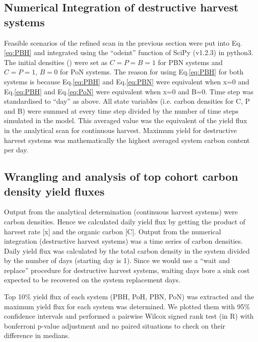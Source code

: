 \documentclass[../thesis.tex]{subfiles} %
\begin{document}
\subsection{Numerical Integration of destructive harvest systems}
Feasible scenarios of the refined scan in the previous section were put into Eq.\ref{eq:PBH} and integrated using the ``odeint” function of SciPy (v1.2.3) in python3.  The initial densities (\den) were set as $C=P=B=1$ for PBN systems and $C=P=1$, $B=0$ for PoN systems.  The reason for using Eq.\ref{eq:PBH} for both systems is because Eq.\ref{eq:PBH} and Eq.\ref{eq:PBN} were equivalent when x=0 and Eq.\ref{eq:PBH} and Eq.\ref{eq:PoN} were equivalent when x=0 and B=0.  Time step was standardised to ``day” as above.  All state variables (i.e. carbon densities for C, P and B) were summed at every time step divided by the number of time steps simulated in the model.  This averaged value was the equivalent of the yield flux in the analytical scan for continuous harvest.  Maximum yield for destructive harvest systems was mathematically the highest averaged system carbon content per day.

\subsection{Wrangling and analysis of top cohort carbon density yield fluxes}
Output from the analytical determination (continuous harvest systems) were carbon densities.  Hence we calculated daily yield flux by getting the product of harvest rate [x] and the organic carbon [C].  Output from the numerical integration (destructive harvest systems) was a time series of carbon densities.  Daily yield flux was calculated by the total carbon density in the system divided by the number of days (starting day is 1).  Since we would use a “wait and replace” procedure for destructive harvest systems, waiting days bore a sink cost expected to be recovered on the system replacement days.

Top 10\% yield flux of each system (PBH, PoH, PBN, PoN) was extracted and the maximum yield flux for each system was determined.  We plotted them with 95\% confidence intervals and performed a pairwise Wilcox signed rank test (in R) with bonferroni p-value adjustment and no paired situations to check on their difference in medians.
\end{document}

